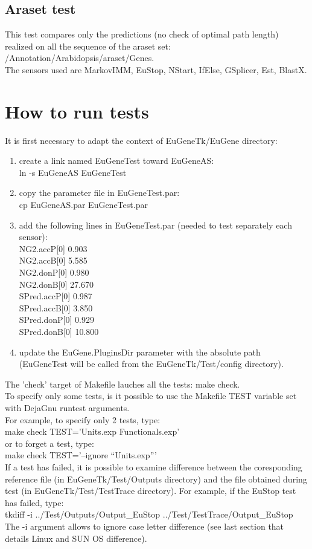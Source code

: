 \documentclass[a4paper,11pt]{article}
\begin{document}
\subsection{Araset test}
This test compares only the predictions (no check of optimal path length) realized on all the sequence of the araset set: /Annotation/Arabidopsis/araset/Genes.\\
The sensors used are MarkovIMM, EuStop, NStart, IfElse, GSplicer, Est, BlastX.\\


\section{How to run tests}
It is first necessary to adapt the context of EuGeneTk/EuGene directory:
\begin{enumerate}
\item create a link named EuGeneTest toward EuGeneAS:\\
         {\sf ln -s EuGeneAS EuGeneTest}
\item copy the parameter file in EuGeneTest.par:\\ 
         {\sf cp EuGeneAS.par EuGeneTest.par}
\item add the following lines in EuGeneTest.par (needed to test separately each sensor):\\
{\sf NG2.accP[0] 0.903\\ 
NG2.accB[0] 5.585\\ 
NG2.donP[0] 0.980\\ 
NG2.donB[0] 27.670\\ 
SPred.accP[0] 0.987\\ 
SPred.accB[0] 3.850\\ 
SPred.donP[0] 0.929\\ 
SPred.donB[0] 10.800}
\item update the EuGene.PluginsDir parameter with the absolute path (EuGeneTest will be called from the EuGeneTk/Test/config directory).
\end{enumerate}
\vspace{0.5cm}
The 'check' target of Makefile lauches all the tests: {\sf make check}.\\
To specify only some tests, is it possible to use the Makefile TEST variable set with DejaGnu runtest arguments.\\
For example, to specify only 2 tests, type: \\
{\sf make check TEST='Units.exp Functionals.exp'} \\
or to forget a test, type: \\
{\sf make check TEST='--ignore ``Units.exp'''}\\
\vspace{0.5cm}
If a test has failed, it is possible to examine difference between the coresponding reference file (in EuGeneTk/Test/Outputs directory) and the file obtained during test (in EuGeneTk/Test/TestTrace directory).
For example, if the EuStop test has failed, type: \\
{\sf tkdiff -i ../Test/Outputs/Output\_EuStop ../Test/TestTrace/Output\_EuStop}\\
The -i argument allows to ignore case letter difference (see last section that details Linux and SUN OS difference).
\end{document}

